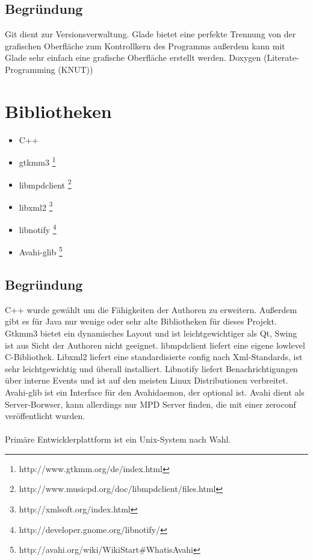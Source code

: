 \subsection{Begründung}
Git dient zur Versionsverwaltung. Glade bietet eine perfekte Trennung von der grafischen 
Oberfläche zum Kontrollkern des Programms außerdem kann mit Glade sehr
einfach eine grafische Oberfläche erstellt werden. Doxygen (Literate-Programming (KNUT))
\section{Bibliotheken}
\begin{itemize}
\item C++
\item gtkmm3 \footnote{http://www.gtkmm.org/de/index.html}
\item libmpdclient \footnote{http://www.musicpd.org/doc/libmpdclient/files.html}
\item libxml2 \footnote{http://xmlsoft.org/index.html}
\item libnotify \footnote{http://developer.gnome.org/libnotify/}
\item Avahi-glib \footnote{http://avahi.org/wiki/WikiStart\#WhatisAvahi}
\end{itemize}
\subsection{Begründung}
C++ wurde gewählt um die Fähigkeiten der Authoren zu erweitern. Außerdem gibt es für Java nur wenige
oder sehr alte Bibliotheken für dieses Projekt. Gtkmm3 bietet ein dynamisches Layout und ist
leichtgewichtiger als Qt, Swing ist aus Sicht der Authoren nicht geeignet. libmpdclient liefert eine 
eigene lowlevel C-Bibliothek.
Libxml2 liefert eine standardisierte config nach Xml-Standards, ist sehr leichtgewichtig und überall
installiert. Libnotify liefert Benachrichtigungen über interne Events und ist auf den meisten Linux
Distributionen verbreitet. Avahi-glib ist ein Interface für den Avahidaemon, der optional ist. Avahi 
dient als Server-Borwser, kann allerdings nur MPD Server finden, die mit einer zeroconf veröffentlicht 
wurden.\ \\ \\
Primäre Entwicklerplattform ist ein Unix-System nach Wahl.
